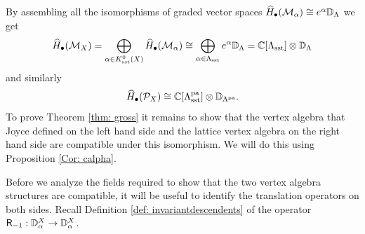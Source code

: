 \documentclass[a4paper, 12pt]{amsart}
\begin{document}
By assembling all the isomorphisms of graded vector spaces $\widehat H_\bullet({\mathcal M}_\alpha)\cong e^\alpha {\mathbb{D}}_\Lambda$ we get
\begin{equation}\label{eq: isovectorspaceva}\widehat H_\bullet({\mathcal M}_X)=\bigoplus_{\alpha\in K_{\text{sst}}^0(X)}\widehat H_\bullet({\mathcal M}_\alpha)\cong \bigoplus_{\alpha\in \Lambda_{\text{sst}}}e^\alpha {\mathbb{D}}_\Lambda={\mathbb{C}}[\Lambda_{\text{sst}}]\otimes {\mathbb{D}}_\Lambda
\end{equation}
and similarly 
\begin{equation}\label{eq: isovectorspacevapa}
\widehat H_\bullet({\mathcal P}_X)\cong {\mathbb{C}}[\Lambda_{\text{sst}}^{\mathop{\rm pa}\nolimits}]\otimes {\mathbb{D}}_{\Lambda^{\mathop{\rm pa}\nolimits}}.
\end{equation}
To prove Theorem \ref{thm: gross} it remains to show that the vertex algebra that Joyce defined on the left hand side and the lattice vertex algebra on the right hand side are compatible under this isomorphism. We will do this using Proposition \ref{Cor: calpha}. 

Before we analyze the fields required to show that the two vertex algebra structures are compatible, it will be useful to identify the translation operators on both sides. Recall Definition \ref{def: invariantdescendents} of the operator $\mathsf{R}_{-1}: {\mathbb{D}}^X_\alpha\to {\mathbb{D}}^X_\alpha$.
\end{document}
